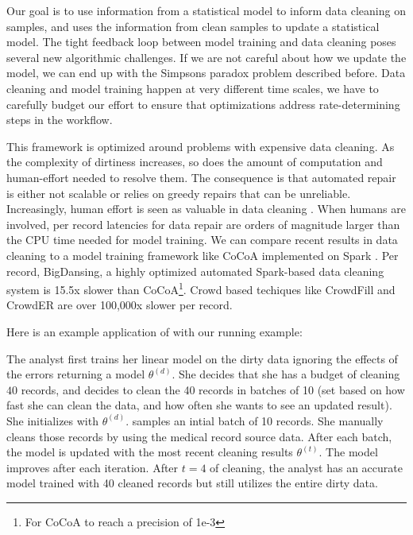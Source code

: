 Our goal is to use information from a statistical model to inform data cleaning on samples, and uses the information from clean samples to update a statistical model.
The tight feedback loop between model training and data cleaning poses several new algorithmic challenges. 
If we are not careful about how we update the model, we can end up with the Simpsons paradox problem described before.
Data cleaning and model training happen at very different time scales, we have to carefully budget our effort to ensure that optimizations address rate-determining steps in the workflow.

This framework is optimized around problems with expensive data cleaning.
As the complexity of dirtiness increases, so does the amount of computation and human-effort needed to resolve them.
The consequence is that automated repair is either not scalable or relies on greedy repairs that can be unreliable.
Increasingly, human effort is seen as valuable in data cleaning \cite{park2014crowdfill, wang2012crowder, gokhale2014corleone, wang1999sample}.
When humans are involved, per record latencies for data repair are orders of magnitude larger than the CPU time needed for model training.
We can compare recent results in data cleaning to a model training framework like CoCoA implemented on Spark \cite{jaggi2014communication}.
Per record, BigDansing, a highly optimized automated Spark-based data cleaning system is 15.5x slower than CoCoA\footnote{For CoCoA to reach a precision of 1e-3}.
Crowd based techiques like CrowdFill \cite{park2014crowdfill} and CrowdER \cite{wang2012crowder} are over 100,000x slower per record.

\noindent Here is an example application of \sys with our running example:
\begin{example}
The analyst first trains her linear model on the dirty data ignoring the effects of the errors returning a model $\theta^{(d)}$.
She decides that she has a budget of cleaning $40$ records, and decides to clean the 40 records in batches of 10 (set based on how fast she can clean the data, and how often she wants to see an updated result).
She initializes \sys with $\theta^{(d)}$.
\sys samples an intial batch of 10 records.
She manually cleans those records by using the medical record source data.
After each batch, the model is updated with the most recent cleaning results $\theta^{(t)}$.
The model improves after each iteration.
After $t=4$ of cleaning, the analyst has an accurate model trained with 40 cleaned records but still utilizes the entire dirty data.
\end{example}

